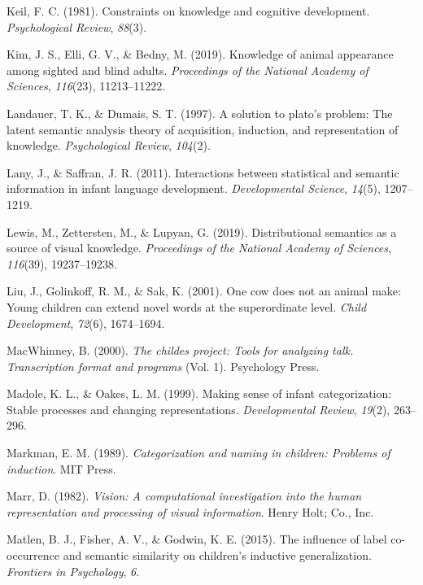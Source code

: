 \documentclass[english,,man,floatsintext]{apa6}
\begin{document}
\leavevmode\hypertarget{ref-keil1981}{}%
Keil, F. C. (1981). Constraints on knowledge and cognitive development. \emph{Psychological Review}, \emph{88}(3).

\leavevmode\hypertarget{ref-kim2019}{}%
Kim, J. S., Elli, G. V., \& Bedny, M. (2019). Knowledge of animal appearance among sighted and blind adults. \emph{Proceedings of the National Academy of Sciences}, \emph{116}(23), 11213--11222.

\leavevmode\hypertarget{ref-landauer1997}{}%
Landauer, T. K., \& Dumais, S. T. (1997). A solution to plato's problem: The latent semantic analysis theory of acquisition, induction, and representation of knowledge. \emph{Psychological Review}, \emph{104}(2).

\leavevmode\hypertarget{ref-lany2011}{}%
Lany, J., \& Saffran, J. R. (2011). Interactions between statistical and semantic information in infant language development. \emph{Developmental Science}, \emph{14}(5), 1207--1219.

\leavevmode\hypertarget{ref-lewis2019}{}%
Lewis, M., Zettersten, M., \& Lupyan, G. (2019). Distributional semantics as a source of visual knowledge. \emph{Proceedings of the National Academy of Sciences}, \emph{116}(39), 19237--19238.

\leavevmode\hypertarget{ref-liu2001}{}%
Liu, J., Golinkoff, R. M., \& Sak, K. (2001). One cow does not an animal make: Young children can extend novel words at the superordinate level. \emph{Child Development}, \emph{72}(6), 1674--1694.

\leavevmode\hypertarget{ref-macwhinney2000}{}%
MacWhinney, B. (2000). \emph{The childes project: Tools for analyzing talk. Transcription format and programs} (Vol. 1). Psychology Press.

\leavevmode\hypertarget{ref-madole1999}{}%
Madole, K. L., \& Oakes, L. M. (1999). Making sense of infant categorization: Stable processes and changing representations. \emph{Developmental Review}, \emph{19}(2), 263--296.

\leavevmode\hypertarget{ref-markman1989}{}%
Markman, E. M. (1989). \emph{Categorization and naming in children: Problems of induction}. MIT Press.

\leavevmode\hypertarget{ref-marr1982}{}%
Marr, D. (1982). \emph{Vision: A computational investigation into the human representation and processing of visual information}. Henry Holt; Co., Inc.

\leavevmode\hypertarget{ref-matlen2015}{}%
Matlen, B. J., Fisher, A. V., \& Godwin, K. E. (2015). The influence of label co-occurrence and semantic similarity on children's inductive generalization. \emph{Frontiers in Psychology}, \emph{6}.
\end{document}
